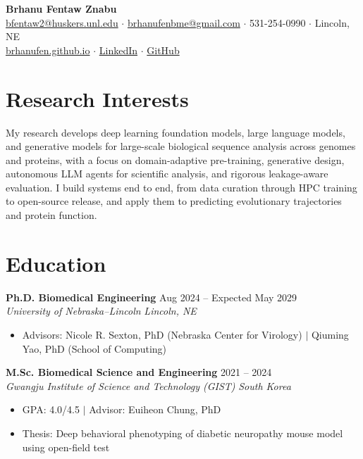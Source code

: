 \documentclass[10pt,a4paper]{article}
\newcommand{\entry}[4]{%
  \textbf{#1} \hfill #2 \\
  \textit{#3} \hfill \textit{#4} \\[1pt]
}
\begin{document}
\begin{center}
  {\LARGE \textbf{Brhanu Fentaw Znabu}} \\[4pt]
  \href{mailto:bfentaw2@huskers.unl.edu}{bfentaw2@huskers.unl.edu} $\cdot$
  \href{mailto:brhanufenbme@gmail.com}{brhanufenbme@gmail.com} $\cdot$
  531-254-0990 $\cdot$ Lincoln, NE \\[2pt]
  \href{https://brhanufen.github.io}{brhanufen.github.io} $\cdot$
  \href{https://linkedin.com/in/brhanu-fentaw-znabu-23115619a}{LinkedIn} $\cdot$
  \href{https://github.com/brhanufen}{GitHub}
\end{center}

\section{Research Interests}
My research develops deep learning foundation models, large language models, and generative models for large-scale biological sequence analysis across genomes and proteins, with a focus on domain-adaptive pre-training, generative design, autonomous LLM agents for scientific analysis, and rigorous leakage-aware evaluation. I build systems end to end, from data curation through HPC training to open-source release, and apply them to predicting evolutionary trajectories and protein function.

\section{Education}

\entry{Ph.D. Biomedical Engineering}{Aug 2024 -- Expected May 2029}
{University of Nebraska--Lincoln}{Lincoln, NE}
\begin{itemize}[leftmargin=1.2em, topsep=0pt, itemsep=1pt, parsep=0pt]
  \item Advisors: Nicole R. Sexton, PhD (Nebraska Center for Virology) $|$ Qiuming Yao, PhD (School of Computing)
\end{itemize}
\vspace{1pt}

\entry{M.Sc. Biomedical Science and Engineering}{2021 -- 2024}
{Gwangju Institute of Science and Technology (GIST)}{South Korea}
\begin{itemize}[leftmargin=1.2em, topsep=0pt, itemsep=1pt, parsep=0pt]
  \item GPA: 4.0/4.5 $|$ Advisor: Euiheon Chung, PhD
  \item Thesis: Deep behavioral phenotyping of diabetic neuropathy mouse model using open-field test
\end{itemize}
\vspace{1pt}
\end{document}
